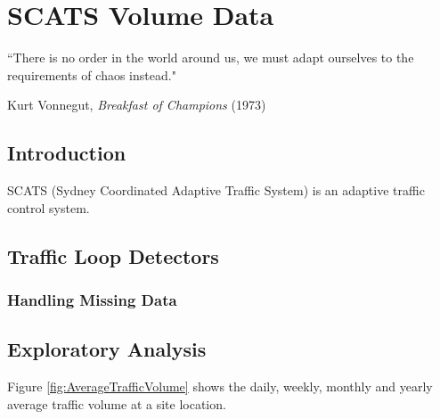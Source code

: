 
\chapter{SCATS Volume Data} %

\label{Chapter3}


``There is no order in the world around us, we must adapt ourselves to the requirements of chaos
instead."

\begin{flushright}
Kurt Vonnegut, \textit{Breakfast of Champions} (1973)
\end{flushright}


\section{Introduction}
SCATS (Sydney Coordinated Adaptive Traffic System) is an adaptive traffic control system.

\section{Traffic Loop Detectors}

\subsection{Handling Missing Data}


\section{Exploratory Analysis}
Figure \ref{fig:AverageTrafficVolume} shows the daily, weekly, monthly and yearly average traffic
volume at a site
location.

